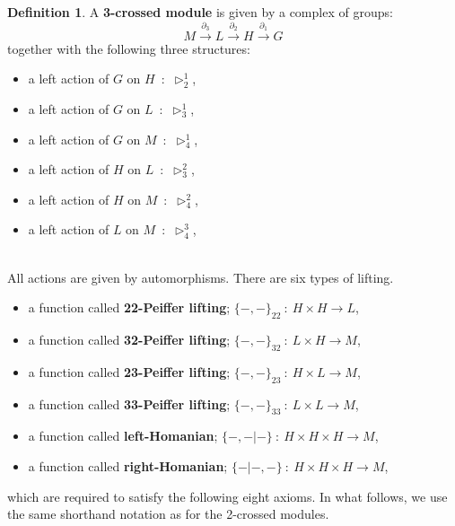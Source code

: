 \documentclass[11pt, reqno]{amsart} %
\theoremstyle{definition}
\newtheorem{definition}[theorem]{Definition}
\theoremstyle{remark}
\numberwithin{equation}{section}
\begin{document}
\begin{definition}\label{def:3CM}
A \textbf{3-crossed module} is given by a complex of groups:
\[
  M\overset{\partial_3}{\longrightarrow} L\overset{\partial_2}{\longrightarrow} H\overset{\partial_1}{\longrightarrow} G
\]
together with the following three structures:\vspace{1em} \\
\begin{minipage}{.49\columnwidth}
\begin{itemize}
  \item a left action of $G$ on $H$~:~$\triangleright^1_2$,
  \item a left action of $G$ on $L$~:~$\triangleright^1_3$,
  \item a left action of $G$ on $M$~:~$\triangleright^1_4$,
\end{itemize}
\end{minipage}
\begin{minipage}{.49\columnwidth}
  \begin{itemize}
    \item a left action of $H$ on $L$~:~$\triangleright^2_3$,
    \item a left action of $H$ on $M$~:~$\triangleright^2_4$,
    \item a left action of $L$ on $M$~:~$\triangleright^3_4$,
  \end{itemize}
\end{minipage}\vspace{1em} \\
All actions are given by automorphisms. There are six types of lifting.
\begin{itemize}
  \item a function called \textbf{22-Peiffer lifting}; $\{-,-\}_{22}~:~H\times H\to L$,
  \item a function called \textbf{32-Peiffer lifting}; $\{-,-\}_{32}~:~L\times H\to M$,
  \item a function called \textbf{23-Peiffer lifting}; $\{-,-\}_{23}~:~H\times L\to M$,
  \item a function called \textbf{33-Peiffer lifting}; $\{-,-\}_{33}~:~L\times L\to M$,
  \item a function called \textbf{left-Homanian}; $\{-,-|-\}~:~H\times H\times H\to M$,
  \item a function called \textbf{right-Homanian}; $\{-|-,-\}~:~H\times H\times H\to M$,
\end{itemize}
which are required to satisfy the following eight axioms. In what follows, we use the same shorthand notation as for the 2-crossed modules.

\end{definition}
\end{document}
